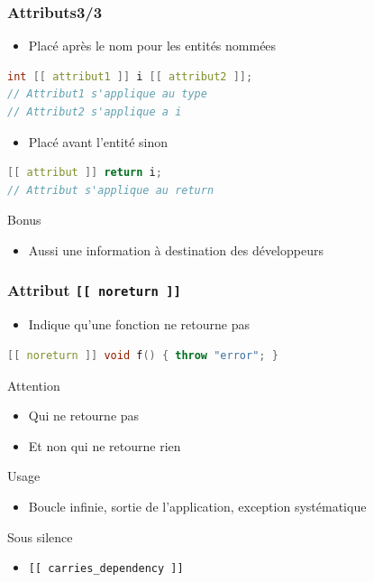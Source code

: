 \documentclass[C++.tex]{subfiles}
\begin{document}
\begin{frame}[fragile]
	\frametitle{Attributs\titlehfill{}3/3}
	\begin{itemize}
		\item Placé après le nom pour les entités nommées
	\end{itemize}

	\begin{lstlisting}[language=C++]
int [[ attribut1 ]] i [[ attribut2 ]];
// Attribut1 s'applique au type
// Attribut2 s'applique a i\end{lstlisting}

	\begin{itemize}
		\item Placé avant l'entité sinon
	\end{itemize}

	\begin{lstlisting}[language=C++]
[[ attribut ]] return i;
// Attribut s'applique au return\end{lstlisting}

	\begin{exampleblock}{Bonus}
		\begin{itemize}
			\item Aussi une information à destination des développeurs
		\end{itemize}
	\end{exampleblock}
\end{frame}

\begin{frame}[fragile]
	\frametitle{Attribut \lstinline|[[ noreturn ]]|}
	\begin{itemize}
		\item Indique qu'une fonction ne retourne pas
	\end{itemize}

	\begin{lstlisting}[language=C++]
[[ noreturn ]] void f() { throw "error"; }\end{lstlisting}

	\begin{alertblock}{Attention}
		\begin{itemize}
			\item Qui ne retourne pas
			\item Et non qui ne retourne rien
		\end{itemize}
	\end{alertblock}

	\begin{block}{Usage}
		\begin{itemize}
			\item Boucle infinie, sortie de l'application, exception systématique
		\end{itemize}
	\end{block}

	\begin{block}{Sous silence}
		\begin{itemize}
			\item \lstinline|[[ carries_dependency ]]|
		\end{itemize}
	\end{block}
\end{frame}
\end{document}

